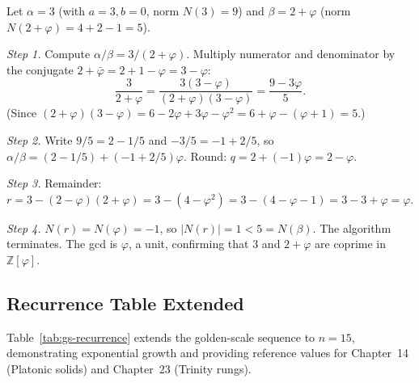 \begin{example}\label{ex:gs-euclid}
Let \(\alpha = 3\) (with \(a=3, b=0\), norm \(N(3)=9\)) and
\(\beta = 2+\varphi\) (norm \(N(2+\varphi) = 4+2-1 = 5\)).

\emph{Step 1.} Compute \(\alpha/\beta = 3/(2+\varphi)\).  Multiply
numerator and denominator by the conjugate \(2+\bar\varphi = 2+1-\varphi
= 3-\varphi\):
\[
  \frac{3}{2+\varphi} = \frac{3(3-\varphi)}{(2+\varphi)(3-\varphi)}
  = \frac{9-3\varphi}{5} .
\]
(Since \((2+\varphi)(3-\varphi) = 6 - 2\varphi + 3\varphi - \varphi^2 =
6 + \varphi - (\varphi+1) = 5\).)

\emph{Step 2.} Write \(9/5 = 2 - 1/5\) and \(-3/5 = -1 + 2/5\), so
\(\alpha/\beta = (2 - 1/5) + (-1 + 2/5)\varphi\).  Round:
\(q = 2 + (-1)\varphi = 2-\varphi\).

\emph{Step 3.} Remainder: \(r = 3 - (2-\varphi)(2+\varphi) = 3 -
(4 - \varphi^2) = 3 - (4 - \varphi - 1) = 3 - 3 + \varphi = \varphi\).

\emph{Step 4.} \(N(r) = N(\varphi) = -1\), so \(|N(r)| = 1 < 5 =
N(\beta)\).  The algorithm terminates.  The gcd is \(\varphi\), a
unit, confirming that \(3\) and \(2+\varphi\) are coprime in
\(\mathbb{Z}[\varphi]\).
\end{example}

\subsection{Recurrence Table Extended}
\label{subsec:gs-rectable}

Table~\ref{tab:gs-recurrence} extends the golden-scale sequence
to \(n = 15\), demonstrating exponential growth and providing
reference values for Chapter~14 (Platonic solids) and Chapter~23
(Trinity rungs).

